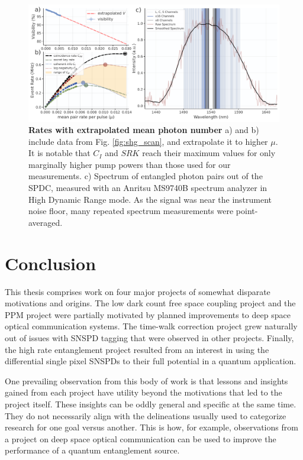 \documentclass[11pt]{caltech_thesis} %
\begin{document}
\hypertarget{fig:scan_extrapolate}{%
\begin{figure}
\centering
\includegraphics[width=1\textwidth,height=\textheight]{./chapter_05/figs/scan_extrapolate_light.pdf}
\caption[{Rates with extrapolated mean photon number}]{\textbf{Rates with extrapolated mean photon number} a) and b) include data from Fig. \ref{fig:shg_scan}, and extrapolate it to higher $\mu$. It is notable that $C_I$ and $SRK$ reach their maximum values for only marginally higher pump powers than those used for our measurements. c) Spectrum of entangled photon pairs out of the SPDC, measured with an Anritsu MS9740B spectrum analyzer in High Dynamic Range mode. As the signal was near the instrument noise floor, many repeated spectrum measurements were point-averaged.}
\label{fig:scan_extrapolate}
\end{figure}
}

\hypertarget{conclusion}{%
\chapter{Conclusion}\label{conclusion}}

This thesis comprises work on four major projects of somewhat disparate motivations and origins. The low dark count free space coupling project and the PPM project were partially motivated by planned improvements to deep space optical communication systems. The time-walk correction project grew naturally out of issues with SNSPD tagging that were observed in other projects. Finally, the high rate entanglement project resulted from an interest in using the differential single pixel SNSPDs to their full potential in a quantum application.

One prevailing observation from this body of work is that lessons and insights gained from each project have utility beyond the motivations that led to the project itself. These insights can be oddly general and specific at the same time. They do not necessarily align with the delineations usually used to categorize research for one goal versus another. This is how, for example, observations from a project on deep space optical communication can be used to improve the performance of a quantum entanglement source.
\end{document}
